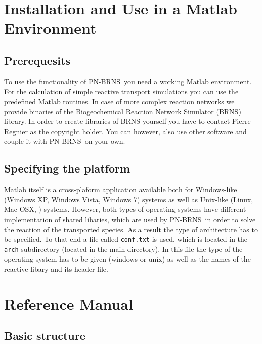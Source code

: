 \documentclass[12pt]{report}
\def\QI{{\sc PN-BRNS}}
\begin{document}

\chapter{Installation and Use in a Matlab Environment}

\section{Prerequesits}

To use the functionality of \QI\ you need a working Matlab environment. For the calculation of simple reactive transport simulations you can use the predefined Matlab routines. In case of more complex reaction networks we provide binaries of the Biogeochemical Reaction Network Simulator (BRNS) library. In order to create libraries of BRNS yourself you have to contact Pierre Regnier as the copyright holder. You can however, also use other software and couple it with \QI\ on your own.

\section{Specifying the platform}

Matlab itself is a cross-plaform application available both for Windows-like (Windows XP, Windows Vista, Windows 7) systems as well as Unix-like (Linux, Mac OSX, ) systems. However, both types of operating systems have different implementation of shared libaries, which are used by \QI\ in order to solve the reaction of the transported species. As a result the type of architecture has to be specified. To that end a file called {\tt conf.txt} is used, which is located in the {\tt arch} subdirectory (located in the main directory). In this file the type of the operating system has to be given (windows or unix) as well as the names of the reactive libary and its header file.


\chapter{Reference Manual}


\section{Basic structure}
\end{document}
